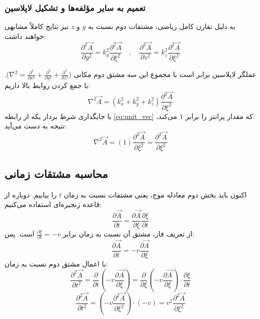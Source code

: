 \documentclass[12pt,a4paper]{article}
\begin{document}
\subsubsection*{تعمیم به سایر مؤلفه‌ها و تشکیل لاپلاسین}
به دلیل تقارن کامل ریاضی، مشتقات دوم نسبت به $y$ و $z$ نیز نتایج کاملاً مشابهی خواهند داشت:
\begin{equation}
    \frac{\partial^2 \vec{A}}{\partial y^2} = k_y^2 \frac{\partial^2 \vec{A}}{\partial \xi^2} \quad , \quad \frac{\partial^2 \vec{A}}{\partial z^2} = k_z^2 \frac{\partial^2 \vec{A}}{\partial \xi^2}
\end{equation}

عملگر لاپلاسین برابر است با مجموع این سه مشتق دوم مکانی ($\nabla^2 = \frac{\partial^2}{\partial x^2} + \frac{\partial^2}{\partial y^2} + \frac{\partial^2}{\partial z^2}$). با جمع کردن روابط بالا داریم:
\begin{equation}
    \nabla^2 \vec{A} = (k_x^2 + k_y^2 + k_z^2) \frac{\partial^2 \vec{A}}{\partial \xi^2}
\end{equation}
با جایگذاری شرط بردار یکه از رابطه \eqref{eq:unit_vec} که مقدار پرانتز را برابر ۱ می‌کند، نتیجه به دست می‌آید:
\begin{equation} \label{eq:laplacian_result}
    \nabla^2 \vec{A} = (1) \frac{\partial^2 \vec{A}}{\partial \xi^2} = \frac{\partial^2 \vec{A}}{\partial \xi^2}
\end{equation}

\subsection{محاسبه مشتقات زمانی}
اکنون باید بخش دوم معادله موج، یعنی مشتقات نسبت به زمان $t$ را بیابیم. دوباره از قاعده زنجیره‌ای استفاده می‌کنیم:
\begin{equation}
    \frac{\partial \vec{A}}{\partial t} = \frac{\partial \vec{A}}{\partial \xi} \frac{\partial \xi}{\partial t}
\end{equation}
از تعریف فاز، مشتق آن نسبت به زمان برابر $\frac{\partial \xi}{\partial t} = -v$ است. پس:
\begin{equation}
    \frac{\partial \vec{A}}{\partial t} = -v \frac{\partial \vec{A}}{\partial \xi}
\end{equation}
با اعمال مشتق دوم نسبت به زمان:
\begin{equation}
    \frac{\partial^2 \vec{A}}{\partial t^2} = \frac{\partial}{\partial t} \left( -v \frac{\partial \vec{A}}{\partial \xi} \right) = \frac{\partial}{\partial \xi} \left( -v \frac{\partial \vec{A}}{\partial \xi} \right) \cdot \frac{\partial \xi}{\partial t}
\end{equation}
\begin{equation} \label{eq:time_result}
    \frac{\partial^2 \vec{A}}{\partial t^2} = \left( -v \frac{\partial^2 \vec{A}}{\partial \xi^2} \right) \cdot (-v) = v^2 \frac{\partial^2 \vec{A}}{\partial \xi^2}
\end{equation}
\end{document}
